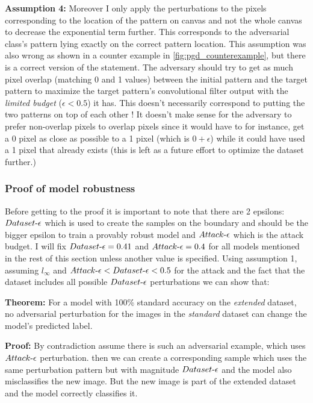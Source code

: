 \documentclass[../thesis.tex]{subfiles}
\begin{document}
	\textbf{Assumption 4:} Moreover I only apply the perturbations to the pixels corresponding to the location of the pattern on canvas and not the whole canvas to decrease the exponential term further. This corresponds to the adversarial class's pattern lying exactly on the correct pattern location. This assumption was also wrong as shown in a counter example in \ref{fig:pgd_counterexample}, but there is a correct version of the statement. The adversary should try to get as much pixel overlap (matching 0 and 1 values) between the initial pattern and the target pattern to maximize the target pattern's convolutional filter output with the \textit{limited budget} ($\epsilon < 0.5$) it has. This doesn't necessarily correspond to putting the two patterns on top of each other ! It doesn't make sense for the adversary to prefer non-overlap pixels to overlap pixels since it would have to for instance, get a 0 pixel as close as possible to a 1 pixel (which is $0 + \epsilon$) while it could have used a 1 pixel that already exists (this is left as a future effort to optimize the dataset further.) 
	
	
	\subsubsection{Proof of model robustness}
	
	Before getting to the proof it is important to note that there are 2 epsilons: $Dataset\text{-}\epsilon$ which is used to create the samples on the boundary and should be the bigger epsilon to train a provably robust model and $Attack\text{-}\epsilon$ which is the attack budget. I will fix $Dataset\text{-}\epsilon=0.41$ and $Attack\text{-}\epsilon=0.4$ for all models mentioned in the rest of this section unless another value is specified. Using assumption 1, assuming $l_{\infty}$ and $Attack\text{-}\epsilon < Dataset\text{-}\epsilon < 0.5$ for the attack and the fact that the dataset includes all possible $Dataset\text{-}\epsilon$ perturbations we can show that: 
	
	\textbf{Theorem:} For a model with 100\% standard accuracy on the \textit{extended} dataset, no adversarial perturbation for the images in the \textit{standard} dataset can change the model's predicted label.
	
	\textbf{Proof:} By contradiction assume there is such an adversarial example, which uses $Attack\text{-}\epsilon$ perturbation. then we can create a corresponding sample which uses the same perturbation pattern but with magnitude $Dataset\text{-}\epsilon$ and the model also misclassifies the new image. But the new image is part of the extended dataset and the model correctly classifies it. \qedsymbol{} 
	
\end{document}
